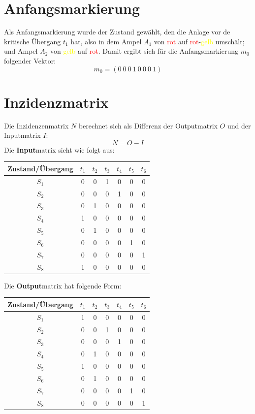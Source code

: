 \documentclass{article}
\begin{document}
	\section{Anfangsmarkierung}
		Als Anfangsmarkierung wurde der Zustand gewählt, den die Anlage vor de kritische Übergang $t_1$ hat, also in dem Ampel $A_1$ von \textcolor{red}{rot} auf \textcolor{red}{rot}-\textcolor{yellow}{gelb} umschält; und Ampel $A_2$ von \textcolor{yellow}{gelb} auf \textcolor{red}{rot}.
		Damit ergibt sich für die Anfangsmarkierung $m_0$ folgender Vektor:
		$$m_0 = (0\ 0\ 0\ 1\ 0\ 0\ 0\ 1)$$
	\section{Inzidenzmatrix}
		Die Inzidenzenmatrix $N$ berechnet sich als Differenz der Outputmatrix $O$ und der Inputmatrix $I$:
		$$N = O -I$$
		Die \textbf{Input}matrix sieht wie folgt aus:\\
		\begin{center}
			\begin{tabular}{| c || c c c c c c |}
				\hline
				Zustand/Übergang	 & $t_1$ & $t_2$ & $t_3$ & $t_4$ & $t_5$ & $t_6$ \\
				\hline\hline
				$S_1$ & 0 & 0 & 1 & 0 & 0 & 0\\
				$S_2$ & 0 & 0 & 0 & 1 & 0 & 0\\
				$S_3$ & 0 & 1 & 0 & 0 & 0 & 0\\
				$S_4$ & 1 & 0 & 0 & 0 & 0 & 0\\
				$S_5$ & 0 & 1 & 0 & 0 & 0 & 0\\
				$S_6$ & 0 & 0 & 0 & 0 & 1 & 0\\
				$S_7$ & 0 & 0 & 0 & 0 & 0 & 1\\
				$S_8$ & 1 & 0 & 0 & 0 & 0 & 0\\
				\hline
			\end{tabular}
		\end{center}
\vspace{5mm}
		Die \textbf{Output}matrix hat folgende Form:\\
		\begin{center}
			\begin{tabular}{| c || c c c c c c |}
				\hline
				Zustand/Übergang	 & $t_1$ & $t_2$ & $t_3$ & $t_4$ & $t_5$ & $t_6$ \\
				\hline\hline
				$S_1$ & 1 & 0 & 0 & 0 & 0 & 0\\
				$S_2$ & 0 & 0 & 1 & 0 & 0 & 0\\
				$S_3$ & 0 & 0 & 0 & 1 & 0 & 0\\
				$S_4$ & 0 & 1 & 0 & 0 & 0 & 0\\
				$S_5$ & 1 & 0 & 0 & 0 & 0 & 0\\
				$S_6$ & 0 & 1 & 0 & 0 & 0 & 0\\
				$S_7$ & 0 & 0 & 0 & 0 & 1 & 0\\
				$S_8$ & 0 & 0 & 0 & 0 & 0 & 1\\
				\hline
			\end{tabular}
		\end{center}
\end{document}
